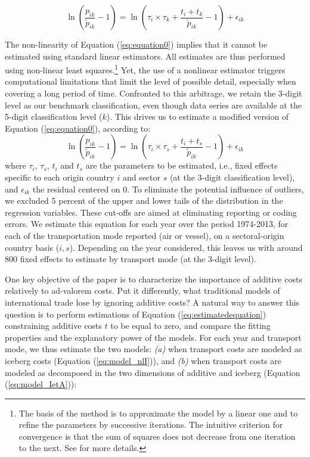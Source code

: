 \documentclass[a4paper,11pt]{article}
\begin{document}
\begin{equation}
\ln\left(\frac{p_{ik}}{\widetilde{p}_{ik}}-1 \right)= \ln \left(\tau_{i} \times \tau_{k}+\frac{t_{i} + t_{k}}{\widetilde{p}_{ik}}-1 \right) + \epsilon_{ik} \label{eq:equation0}
\end{equation}

The non-linearity of Equation (\ref{eq:equation0}) implies that it cannot be estimated using standard linear estimators. All estimates are thus performed using non-linear least squares.\footnote{The basis of the method is to approximate the model by a linear one and to refine the parameters by successive iterations. The intuitive criterion for convergence is that the sum of squares does not decrease from one iteration to the next. See \cite{Woolridge-Book-2001} for more details.} Yet, the use of a nonlinear estimator triggers computational limitations that limit the level of possible detail, especially when covering a long period of time. Confronted to this arbitrage, we retain the 3-digit level as our benchmark classification, even though data series are available at the 5-digit classification level ($k$). This drives us to estimate a modified version of Equation (\ref{eq:equation0}), according to:
\begin{equation}
\ln\left(\frac{p_{ik}}{\widetilde{p}_{ik}}-1 \right)= \ln \left(\tau_{i} \times \tau_{s}+\frac{t_{i} + t_{s}}{\widetilde{p}_{ik}}-1 \right) + \epsilon_{ik} \label{eq:estimatedequation}
\end{equation}
where $\tau_{i}$, $\tau_{s}$, $t_{i}$ and $t_{s}$ are the parameters to be estimated, i.e., fixed effects specific to each origin country $i$ and sector $s$ (at the 3-digit classification level), and $\epsilon_{ik}$ the residual centered on 0. To eliminate the potential influence of outliers, we excluded 5 percent of the upper and lower tails of the distribution in the regression variables. These cut-offs are aimed at eliminating reporting or coding errors. We estimate this equation for each year over the period 1974-2013, for each of the transportation mode reported (air or vessel), on a sectoral-origin country basis ($i,s$). Depending on the year considered, this leaves us with around 800 fixed effects to estimate by transport mode (at the 3-digit level).   \smallskip

One key objective of the paper is to characterize the importance of additive costs relatively to ad-valorem costs. Put it differently, what traditional models of international trade lose by ignoring additive costs? A natural way to answer this question is to perform estimations of Equation (\ref{eq:estimatedequation}) constraining additive costs $t$ to be equal to zero, and compare the fitting properties and the explanatory power of the models. For each year and transport mode, we thus estimate the two models: \textit{(a)} when transport costs are modeled as iceberg costs (Equation (\ref{eq:model_nlI})), and \textit{(b)} when transport costs are modeled as decomposed in the two dimensions of additive and iceberg (Equation (\ref{eq:model_IetA})):
\end{document}
